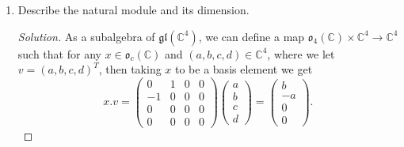 \documentclass[12pt]{article}
\theoremstyle{definition}
\newenvironment{solution}
{\renewcommand\qedsymbol{$\blacksquare$}\begin{proof}[Solution]}
{\end{proof}}
\begin{document}
\begin{enumerate}
\begin{enumerate}
\begin{solution}
                            \begin{equation*}
                                \begin{split}
                                    &(\alpha x+\beta y).u
                                    = 0 = \alpha(0)+\beta(0)=\alpha(x.u)+\beta(y.u)
                                    \\
                                    &x.(\alpha u+\beta
                                    v)=0=\alpha(0)+\beta(0)=\alpha(x.u)+\beta(x.v)
                                    \\
                                    &[x, y].u
                                    = 0 = x.(0)+y.(0)=x.(y.u)+y.(x.u).
                                \end{split}
                            \end{equation*}
                        As a module, then by Lemma 4.7, it is a representation
                        of $L$. Thus, with $F=\mathbb{C}$, then the trivial
                        representation is a 1-dimensional representation and
                        hence a 1-dimensional module.
                    \end{solution}\newpage
                \item Describe the natural module and its dimension.
                    \begin{solution}
                        As a subalgebra of $\mathfrak{gl}(\mathbb{C}^4)$, we
                        can define a map $\mathfrak{o}_4(\mathbb{C})\times
                        \mathbb{C}^4\to \mathbb{C}^4$ such that for any
                        $x\in\mathfrak{o}_c(\mathbb{C})$ and $(a, b, c, d)\in
                        \mathbb{C}^4$, where we let $v=(a, b, c, d)^T$, then
                        taking $x$ to be a basis element we get
                        \begin{equation*}
                            x.v=\begin{pmatrix}0&1&0&0\\-1&0&0&0\\0&0&0&0\\0&0&0&0\end{pmatrix}
                            \begin{pmatrix}a\\b\\c\\d \end{pmatrix}=
                            \begin{pmatrix}b\\-a\\0\\0 \end{pmatrix}. 

\end{equation*}
\end{solution}
\end{enumerate}
\end{enumerate}
\end{document}
